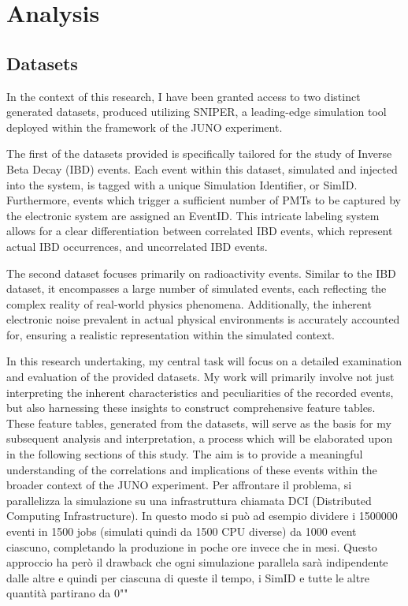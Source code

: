 \chapter{Analysis}

\section{Datasets}
In the context of this research, I have been granted access to two distinct generated datasets, produced utilizing SNIPER, a leading-edge simulation tool deployed within the framework of the JUNO experiment. 

The first of the datasets provided is specifically tailored for the study of Inverse Beta Decay (IBD) events. Each event within this dataset, simulated and injected into the system, is tagged with a unique Simulation Identifier, or SimID. Furthermore, events which trigger a sufficient number of PMTs to be captured by the electronic system are assigned an EventID. This intricate labeling system allows for a clear differentiation between correlated IBD events, which represent actual IBD occurrences, and uncorrelated IBD events.



The second dataset focuses primarily on radioactivity events. Similar to the IBD dataset, it encompasses a large number of simulated events, each reflecting the complex reality of real-world physics phenomena. Additionally, the inherent electronic noise prevalent in actual physical environments is accurately accounted for, ensuring a realistic representation within the simulated context.

In this research undertaking, my central task will focus on a detailed examination and evaluation of the provided datasets. My work will primarily involve not just interpreting the inherent characteristics and peculiarities of the recorded events, but also harnessing these insights to construct comprehensive feature tables. These feature tables, generated from the datasets, will serve as the basis for my subsequent analysis and interpretation, a process which will be elaborated upon in the following sections of this study. The aim is to provide a meaningful understanding of the correlations and implications of these events within the broader context of the JUNO experiment.
Per affrontare il problema, si parallelizza la simulazione su una infrastruttura chiamata DCI (Distributed Computing Infrastructure).
In questo modo si può ad esempio dividere i 1500000 eventi in 1500 jobs (simulati quindi da 1500 CPU diverse) da 1000 event ciascuno, completando la produzione in poche ore invece che in mesi.
Questo approccio ha però il drawback che ogni simulazione parallela sarà indipendente dalle altre e quindi per ciascuna di queste il tempo, i SimID e tutte le altre quantità partirano da 0"" 



